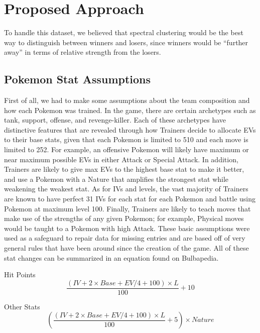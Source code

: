 \documentclass{acm_proc_article-sp}
\begin{document}
\section{Proposed Approach}
To handle this dataset, we believed that spectral clustering would be the best way to distinguish between winners and losers, since winners would be “further away” in terms of relative strength from the losers.

\subsection{Pokemon Stat Assumptions}
First of all, we had to make some assumptions about the team composition and how each Pokemon was trained. In the game, there are certain archetypes such as tank, support, offense, and revenge-killer. Each of these archetypes have distinctive features that are revealed through how Trainers decide to allocate EVs to their base stats, given that each Pokemon is limited to 510 and each move is limited to 252. For example, an offensive Pokemon will likely have maximum or near maximum possible EVs in either Attack or Special Attack. In addition, Trainers are likely to give max EVs to the highest base stat to make it better, and use a Pokemon with a Nature that amplifies the strongest stat while weakening the weakest stat. As for IVs and levels, the vast majority of Trainers are known to have perfect 31 IVs for each stat for each Pokemon and battle using Pokemon at maximum level 100. Finally, Trainers are likely to teach moves that make use of the strengths of any given Pokemon; for example, Physical moves would be taught to a Pokemon with high Attack. These basic assumptions were used as a safeguard to repair data for missing entries and are based off of very general rules that have been around since the creation of the game. All of these stat changes can be summarized in an equation found on Bulbapedia.

Hit Points
\begin{equation}\frac{(IV + 2 \times Base + EV/4 + 100) \times L}{100} + 10
\end{equation}

Other Stats
\begin{equation}(\frac{(IV + 2 \times Base + EV/4 + 100) \times L}{100} + 5) \times Nature
\end{equation}
\end{document}
